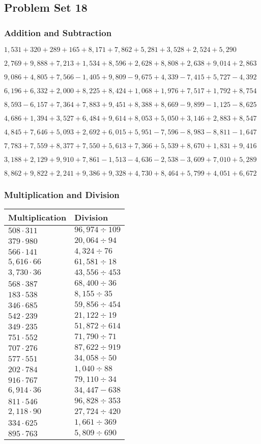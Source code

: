 \hypertarget{problem-set-18-3}{%
\subsection{Problem Set 18}\label{problem-set-18-3}}

\hypertarget{addition-and-subtraction-180}{%
\subsubsection{Addition and
Subtraction}\label{addition-and-subtraction-180}}

\(1,531+320+289+165+8,171+7,862+5,281+3,528+2,524+ 5,290\)

\(2,769+9,888+7,213+1,534+8,596+2,628+8,808+2,638+9,014+2,863\)

\(9,086+4,805+7,566-1,405+9,809-9,675+4,339-7,415+5,727-4,392\)

\(6,196+6,332+2,000+8,225+8,424+1,068+1,976+7,517+1,792+8,754\)

\(8,593-6,157+7,364+7,883+9,451+8,388+8,669-9,899-1,125-8,625\)

\(4,686+1,394+3,527+6,484+9,614+8,053+5,050+3,146+2,883+8,547\)

\(4,845+7,646+5,093+2,692+6,015+5,951-7,596-8,983-8,811-1,647\)

\(7,783+7,559+8,377+7,550+5,613+7,366+5,539+8,670+1,831+9,416\)

\(3,188+2,129+9,910+7,861-1,513-4,636-2,538-3,609+7,010+5,289\)

\(8,862+9,822+2,241+9,386+9,328+4,730+8,464+5,799+4,051+6,672\)

\hypertarget{multiplication-and-division-179}{%
\subsubsection{Multiplication and
Division}\label{multiplication-and-division-179}}

\begin{longtable}[]{@{}ll@{}}
\toprule
Multiplication & Division\tabularnewline
\midrule
\endhead
\(508\cdot311\) & \(96,974÷109\)\tabularnewline
\(379\cdot980\) & \(20,064÷94\)\tabularnewline
\(566\cdot141\) & \(4,324÷76\)\tabularnewline
\(5,616\cdot66\) & \(61,581÷18\)\tabularnewline
\(3,730\cdot36\) & \(43,556÷453\)\tabularnewline
\(568\cdot387\) & \(68,400÷36\)\tabularnewline
\(183\cdot538\) & \(8,155÷35\)\tabularnewline
\(346\cdot685\) & \(59,856÷454\)\tabularnewline
\(542\cdot239\) & \(21,122÷19\)\tabularnewline
\(349\cdot235\) & \(51,872÷614\)\tabularnewline
\(751\cdot552\) & \(71,790÷71\)\tabularnewline
\(707\cdot276\) & \(87,622÷919\)\tabularnewline
\(577\cdot551\) & \(34,058÷50\)\tabularnewline
\(202\cdot784\) & \(1,040÷88\)\tabularnewline
\(916\cdot767\) & \(79,110÷34\)\tabularnewline
\(6,914\cdot36\) & \(34,447 - 638\)\tabularnewline
\(811\cdot546\) & \(96,828÷353\)\tabularnewline
\(2,118\cdot90\) & \(27,724÷420\)\tabularnewline
\(334\cdot625\) & \(1,661÷369\)\tabularnewline
\(895\cdot763\) & \(5,809÷690\)\tabularnewline
\bottomrule
\end{longtable}

